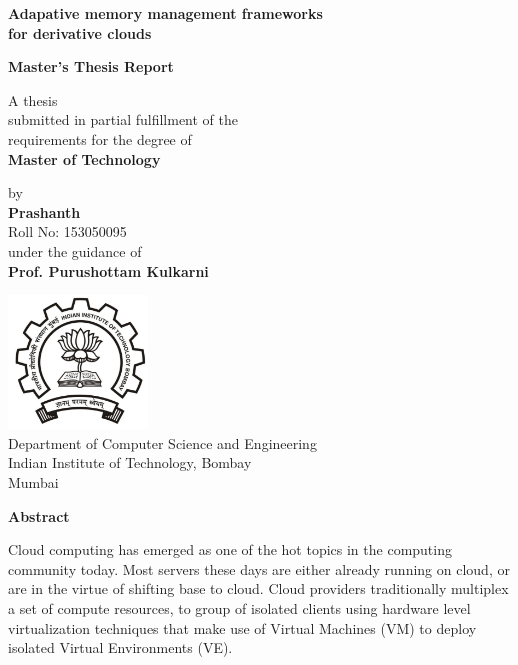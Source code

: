\documentclass[11pt,a4paper]{report}
\newcommand{\putiitblogo}{\includegraphics[width=10em]{iitb-black}}
\begin{document}
  \begin{titlepage}    
    \begin{center}
   
      \Large \textbf{Adapative memory management frameworks \\for derivative clouds}  \\
      \vspace{5em}
      
      \large \textbf{Master's Thesis Report} \\
      \vspace{5em}
      
      \normalsize A thesis \\submitted in partial fulfillment of the \\requirements for the degree of \\
      \vspace{1em}      
      \large \textbf{Master of Technology} \\
      \vspace{5em}
      
      \normalsize by \\
      \vspace{1em}      
      \large \textbf{Prashanth} \\ 
      \vspace{0.5em}
      \normalsize Roll No: 153050095 \\
      
      \vspace{5em}
      \normalsize under the guidance of \\
      \vspace{0.5em}      
      \large \textbf{Prof. Purushottam Kulkarni} \\
      \vspace{5em}
      
      \putiitblogo \\
      \Large 
      Department of Computer Science and Engineering \\
      Indian Institute of Technology, Bombay \\
      Mumbai
      
    \end{center}
  \end{titlepage} 
  
  \begin{center}
    \huge \textbf{Abstract}
  \end{center}
  \vspace*{3em}
  \normalsize 
    Cloud computing has emerged as one of the hot topics in the computing community today. Most servers these days are either 
already running on cloud, or are in the virtue of shifting base to cloud. Cloud providers traditionally multiplex a set of compute 
resources, to group of isolated clients using hardware level virtualization techniques that make use of Virtual Machines (VM) to deploy 
isolated Virtual Environments (VE). 
\end{document}

